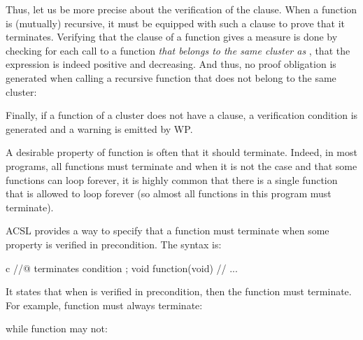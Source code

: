 Thus, let us be more precise about the verification of the 
clause. When a function is (mutually) recursive, it must be equipped with such
a clause to prove that it terminates. Verifying that the 
clause of a function  gives a measure is done by checking for each
call to a function {\em that belongs to the same cluster as },
that the expression is indeed positive and decreasing. And thus, no proof
obligation is generated when calling a recursive function that does not belong
to the same cluster:






Finally, if a function of a cluster does not have a 
clause, a  verification condition is generated
and a warning is emitted by WP.







A desirable property of function is often that it should terminate. Indeed, in
most programs, all functions must terminate and when it is not the case and that
some functions can loop forever, it is highly common that there is a single
function that is allowed to loop forever (so almost all functions in this
program must terminate).






ACSL provides a way to specify that a function must terminate when some property
is verified in precondition. The syntax is:



\begin{CodeBlock}{c}
//@ terminates condition ;
void function(void){
  // ...
}
\end{CodeBlock}



It states that when  is verified in precondition, then
the function must terminate. For example, function  must always
terminate:






while function  may not:



